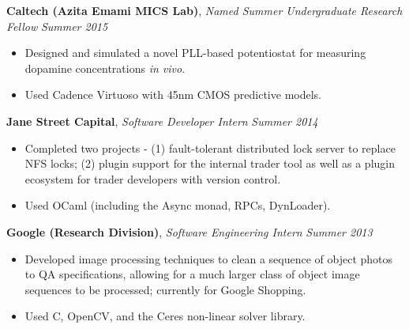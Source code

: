 \documentclass{article}
\newenvironment{changemargin}[2]{%
  \begin{list}{}{%
    \setlength{\topsep}{0pt}%
    \setlength{\leftmargin}{#1}%
    \setlength{\rightmargin}{#2}%
    \setlength{\listparindent}{\parindent}%
    \setlength{\itemindent}{\parindent}%
    \setlength{\parsep}{\parskip}%
  }%
  \item[]}{\end{list}
}
\newenvironment{body} {
	\vspace*{-16pt}
	\begin{changemargin}{-0.25in}{-0.5in}
  }	
	{\end{changemargin}
}
\newcommand{\CC}{C\nolinebreak\hspace{-.05em}\raisebox{.4ex}{\tiny\bf +}\nolinebreak\hspace{-.10em}\raisebox{.4ex}{\tiny\bf +}}
\begin{document}
\begin{body}
	\smallskip

	\textbf{Caltech (Azita Emami MICS Lab)}, \emph{Named Summer Undergraduate Research Fellow} \hfill \emph{Summer 2015}\\
	\vspace*{-4pt}
	\begin{itemize}
		\item Designed and simulated a novel PLL-based potentiostat for measuring dopamine concentrations \emph{in vivo}.
		\item Used Cadence Virtuoso with 45nm CMOS predictive models. %
	\end{itemize}

	\smallskip

	\textbf{Jane Street Capital}, \emph{Software Developer Intern} \hfill \emph{Summer 2014}\\
	\vspace*{-4pt}
	\begin{itemize}
		\item Completed two projects - (1) fault-tolerant distributed lock server to replace NFS locks; (2) plugin support for the internal trader tool as well as a plugin ecosystem for trader developers with version control.
		\item Used OCaml (including the Async monad, RPCs, DynLoader).
	\end{itemize}

	\smallskip

	\textbf{Google (Research Division)}, \emph{Software Engineering Intern} \hfill \emph{Summer 2013}\\
	\vspace*{-4pt}
	\begin{itemize}
		\item Developed image processing techniques to clean a sequence of object photos to QA specifications, allowing for a much larger class of object image sequences to be processed; currently for Google Shopping.
		\item Used \CC, OpenCV, and the Ceres non-linear solver library.
	\end{itemize}




\end{body}
\end{document}
